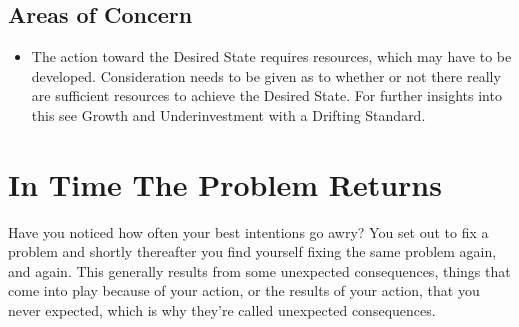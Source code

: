 \documentclass[]{memoir}
\begin{document}
\subsection{Areas of Concern}

\begin{itemize}
\itemsep1pt\parskip0pt
\item
  The action toward the Desired State requires resources, which may have
  to be developed. Consideration needs to be given as to whether or not
  there really are sufficient resources to achieve the Desired State.
  For further insights into this see Growth and Underinvestment with a
  Drifting Standard.
\end{itemize}

\section{In Time The Problem Returns}

Have you noticed how often your best intentions go awry? You set out to
fix a problem and shortly thereafter you find yourself fixing the same
problem again, and again. This generally results from some unexpected
consequences, things that come into play because of your action, or the
results of your action, that you never expected, which is why they're
called unexpected consequences.

\FloatBarrier 
\end{document}
